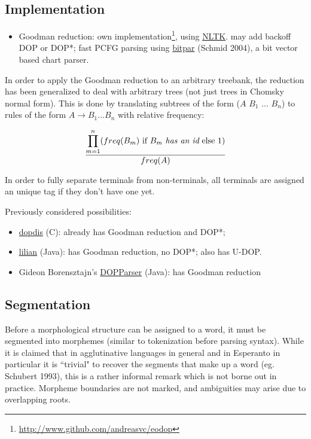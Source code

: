 \documentclass[10pt,a4paper]{article}
\begin{document}
\subsection{Implementation}

\begin{itemize}
\item Goodman reduction: 
own implementation\footnote{\url{http://www.github.com/andreasvc/eodop}}, using 
\href{http://groups.google.com/group/nltk-dev/browse_thread/thread/86ca038723195978/c112b8d171b33d25}{NLTK}. 
may add backoff DOP or DOP*; fast PCFG parsing using 
\href{http://www.ims.uni-stuttgart.de/tcl/SOFTWARE/BitPar.html}{bitpar} 
(Schmid 2004), a bit vector based chart parser.
\end{itemize}

In order to apply the Goodman reduction to an arbitrary treebank, the reduction
has been generalized to deal with arbitrary trees (not just trees in Chomsky
normal form). This is done by translating subtrees of the form 
($A$ $B_1$ ... $B_n$) to rules of the form $A \rightarrow B_1 ... B_n$ with
relative frequency:

\[
\frac{\displaystyle\prod_{m = 1}^n(
\text{$freq(B_m)$ if $B_m$ {\em has an id} else $1$})}{freq(A)}
\] 

\vspace{2em}
In order to fully separate terminals from non-terminals, all terminals are
assigned an unique tag if they don't have one yet.

Previously considered possibilities:

\begin{itemize}
\item \href{http://staff.science.uva.nl/~simaan/dopdis/}{dopdis} (C): already
has Goodman reduction and DOP*;
\item \href{http://sourceforge.net/projects/lilian/}{lilian} (Java): has
Goodman reduction, no DOP*; also has U-DOP.
\item Gideon Borensztajn's \href{http://staff.science.uva.nl/~gideon/sourcecode/DOPParser.tar.gz}{DOPParser} (Java): has Goodman reduction
\end{itemize}

\subsection{Segmentation}

Before a morphological structure can be assigned to a word, it must be
segmented into morphemes (similar to tokenization before parsing syntax). While
it is claimed that in agglutinative languages in general and in Esperanto in
particular it is ``trivial" to recover the segments that make up a word (eg.
Schubert 1993), this is a rather informal remark which is not borne out in
practice.  Morpheme boundaries are not marked, and ambiguities may arise due to
overlapping roots.
\end{document}
